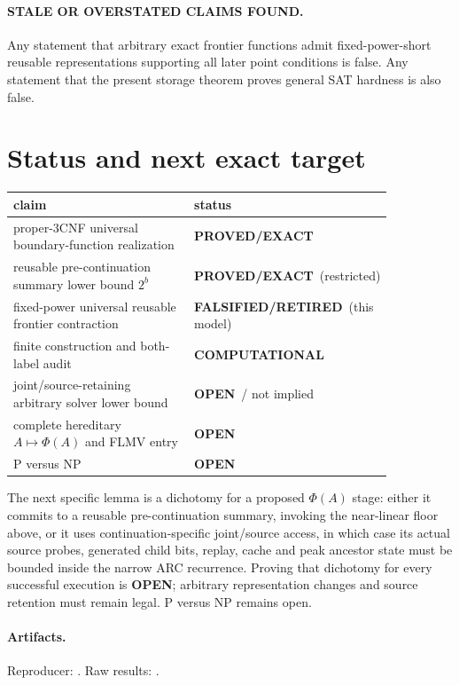 \documentclass[11pt]{article}
\newcommand{\EXACT}{\textbf{PROVED/EXACT}}
\newcommand{\COMP}{\textbf{COMPUTATIONAL}}
\newcommand{\OPEN}{\textbf{OPEN}}
\newcommand{\RET}{\textbf{FALSIFIED/RETIRED}}
\begin{document}
\paragraph{STALE OR OVERSTATED CLAIMS FOUND.}
Any statement that arbitrary exact frontier functions admit fixed-power-short
reusable representations supporting all later point conditions is false.  Any
statement that the present storage theorem proves general SAT hardness is also
false.

\section{Status and next exact target}
\begin{center}
\begin{tabular}{p{0.58\linewidth}p{0.27\linewidth}}
\toprule
claim & status\\
\midrule
proper-3CNF universal boundary-function realization & \EXACT\\
reusable pre-continuation summary lower bound $2^b$ & \EXACT\ (restricted)\\
fixed-power universal reusable frontier contraction & \RET\ (this model)\\
finite construction and both-label audit & \COMP\\
joint/source-retaining arbitrary solver lower bound & \OPEN\ / not implied\\
complete hereditary $A\mapsto\Phi(A)$ and FLMV entry & \OPEN\\
P versus NP & \OPEN\\
\bottomrule
\end{tabular}
\end{center}

The next specific lemma is a dichotomy for a proposed $\Phi(A)$ stage: either
it commits to a reusable pre-continuation summary, invoking the near-linear
floor above, or it uses continuation-specific joint/source access, in which
case its actual source probes, generated child bits, replay, cache and peak
ancestor state must be bounded inside the narrow ARC recurrence.  Proving that
dichotomy for every successful execution is \OPEN; arbitrary representation
changes and source retention must remain legal.  P versus NP remains open.

\paragraph{Artifacts.}
Reproducer:
.
Raw results:
.

\end{document}
